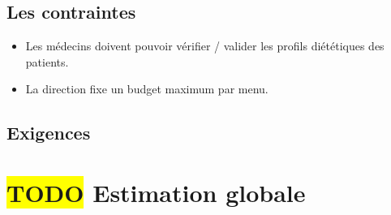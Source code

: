 \subsection{Les contraintes}
\begin{itemize}
\item Les médecins doivent pouvoir vérifier / valider les profils diététiques des patients.
\item La direction fixe un budget maximum par menu.
\end{itemize}

\subsection{Exigences}



\section{\colorbox{yellow}{TODO} Estimation globale}
